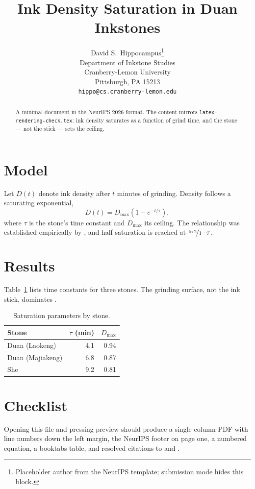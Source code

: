 \documentclass{article}
\title{Ink Density Saturation in Duan Inkstones}
\author{%
  David S.~Hippocampus\thanks{Placeholder author from the NeurIPS template;
    submission mode hides this block.} \\
  Department of Inkstone Studies\\
  Cranberry-Lemon University\\
  Pittsburgh, PA 15213 \\
  \texttt{hippo@cs.cranberry-lemon.edu} \\
}
\begin{document}
\maketitle

\begin{abstract}
  A minimal document in the NeurIPS 2026 format. The content mirrors
  \texttt{latex-rendering-check.tex}: ink density saturates as a function
  of grind time, and the stone --- not the stick --- sets the ceiling.
\end{abstract}

\section{Model}

Let $D(t)$ denote ink density after $t$ minutes of grinding. Density
follows a saturating exponential,
\begin{equation}
  \label{eq:density}
  D(t) = D_{\max}\left(1 - e^{-t/\tau}\right),
\end{equation}
where $\tau$ is the stone's time constant and $D_{\max}$ its ceiling. The
relationship was established empirically by \citet{tanaka2019}, and half
saturation is reached at $\nicefrac{\ln 2}{1} \cdot \tau$.

\section{Results}

Table~\ref{tab:stones} lists time constants for three stones. The
grinding surface, not the ink stick, dominates \citep{mizuta1968}.

\begin{table}[t]
  \caption{Saturation parameters by stone.}
  \label{tab:stones}
  \centering
  \begin{tabular}{lrr}
    \toprule
    Stone & $\tau$ (min) & $D_{\max}$ \\
    \midrule
    Duan (Laokeng)   & 4.1 & 0.94 \\
    Duan (Majiakeng) & 6.8 & 0.87 \\
    She              & 9.2 & 0.81 \\
    \bottomrule
  \end{tabular}
\end{table}

\section{Checklist}

Opening this file and pressing preview should produce a single-column PDF
with line numbers down the left margin, the NeurIPS footer on page one, a
numbered equation, a booktabs table, and resolved citations to
\citet{tanaka2019} and \citet{chen2021}.



\end{document}

